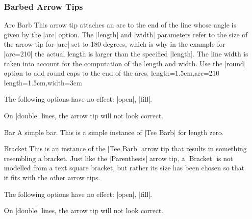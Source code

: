 \subsubsection{Barbed Arrow Tips}

\begin{arrowtip}{Arc Barb}{
    This arrow tip attaches an arc to the end of the line whose angle is given
    by the |arc| option. The |length| and |width| parameters refer to the size
    of the arrow tip for |arc| set to 180 degrees, which is why in the example
    for |arc=210| the actual length is larger than the specified |length|. The
    line width is taken into account for the computation  of the length and
    width. Use the |round| option to add round caps to the end of the arcs.
}%
{length=1.5cm,arc=210}%
{length=1.5cm,width=3cm}

    \begin{arrowexamples}
        \arrowexample[]
        \arrowexampledup[sep]
        \arrowexampledupdot[sep]
        \arrowexample[arc=120]
        \arrowexample[arc=270]
        \arrowexample[length=2pt]
        \arrowexample[length=2pt,width=5pt]
        \arrowexample[line width=2pt]
        \arrowexample[reversed]
        \arrowexample[round]
        \arrowexample[slant=.3]
        \arrowexample[left]
        \arrowexample[right]
        \arrowexample[red]
    \end{arrowexamples}
    The following options have no effect: |open|, |fill|.

    On |double| lines, the arrow tip will not look correct.
\end{arrowtip}

\begin{arrowtipsimple}{Bar}
    A simple bar. This is a simple instance of |Tee Barb| for length zero.
\end{arrowtipsimple}

\begin{arrowtip}{Bracket}{
    This is an instance of the |Tee Barb| arrow tip that results in something
    resembling a bracket. Just like the |Parenthesis| arrow tip, a |Bracket| is
    not modelled from a text square bracket, but rather its size has been
    chosen so that it fits with the other arrow tips.
}%
{}%
{}

    \begin{arrowexamples}
        \arrowexample[]
        \arrowexampledup[sep]
        \arrowexampledupdot[sep]
        \arrowexample[reversed]
        \arrowexample[round]
        \arrowexample[slant=.3]
        \arrowexample[left]
        \arrowexample[right]
        \arrowexample[red]
    \end{arrowexamples}
    The following options have no effect: |open|, |fill|.

    On |double| lines, the arrow tip will not look correct.
\end{arrowtip}

